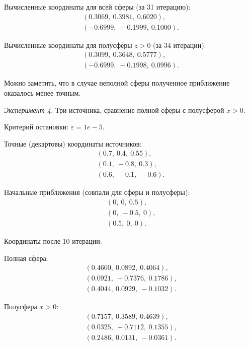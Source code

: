 \newpage
Вычисленные координаты для всей сферы (за 31 итерацию):
\begin{align}
    (0.3069,\ 0.3981,\ 0.6020) \text{,}\nonumber\\
    (-0.6999,\ -0.1999,\ 0.1000) \text{.}\nonumber
\end{align}

Вычисленные координаты для полусферы $z > 0$ (за 34 итерации):
\begin{align}
    (0.3099,\ 0.3648,\ 0.5777) \text{,}\nonumber\\
    (-0.6999,\ -0.1998,\ 0.0996) \text{.}\nonumber
\end{align}

Можно заметить, что в случае неполной сферы полученное приближение оказалось менее точным.

\emph{Эксперимент 4.} Три источника, сравнение полной сферы с полусферой $x > 0$.

Критерий остановки: $\varepsilon = 1e-5$.

Точные (декартовы) координаты источников:
\begin{align}
    (0.7,\ 0.4,\ 0.55) \text{,}\nonumber\\
    (0.1,\ -0.8,\ 0.3) \text{,}\nonumber\\
    (0.6,\ -0.1,\ -0.6) \text{.}\nonumber
\end{align}

Начальные приближения (совпали для сферы и полусферы):
\begin{align}
    (0,\ 0,\ 0.5) \text{,}\nonumber\\
    (0,\ -0.5,\ 0) \text{,}\nonumber\\
    (0.5,\ 0,\ 0) \text{.}\nonumber
\end{align}

Координаты после 10 итерации:

Полная сфера:
\begin{align}
    (0.4600,\ 0.0892,\ 0.4064) \text{,}\nonumber\\
    (0.0921,\ -0.7376,\ 0.1786) \text{,}\nonumber\\
    (0.4044,\ 0.0929,\ -0.1032) \text{.}\nonumber
\end{align}

Полусфера $x > 0$:
\begin{align}
    (0.7157,\ 0.3589,\ 0.4639) \text{,}\nonumber\\
    (0.0325,\ -0.7112,\ 0.1355) \text{,}\nonumber\\
    (0.2486,\ 0.0131,\ -0.0361) \text{.}\nonumber
\end{align}

